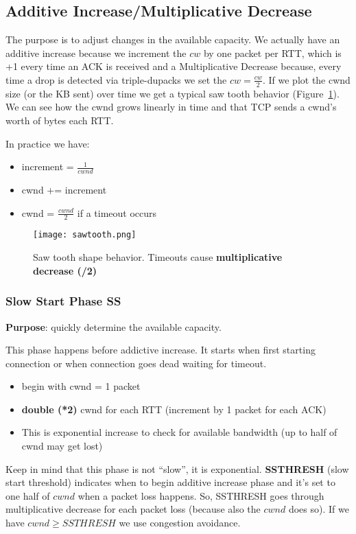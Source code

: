 \subsection{Additive Increase/Multiplicative Decrease}

The purpose is to adjust changes in the available capacity.
We actually have an additive increase because we increment the $cw$ by one
packet per RTT, which is +1 every time an ACK is received and a Multiplicative
Decrease because, every time a drop is detected via triple-dupacks we set the
$cw=\frac{cw}{2}$. If we plot the cwnd size (or the KB sent) over time we get a
typical saw tooth behavior (Figure~\ref{fig:tcp:sawtooth}). We can see how the
cwnd grows linearly in time and that TCP sends a cwnd's worth of bytes each RTT.

In practice we have:
\begin{itemize}
  \item increment = $\frac{1}{cwnd}$
  \item cwnd += increment
  \item cwnd = $\frac{cwnd}{2}$ if a timeout occurs
\end{itemize}

\begin{figure}[t]
\texttt{[image: sawtooth.png]}
\caption[Saw tooth shape behavior]{Saw tooth shape behavior. Timeouts cause
  \textbf{multiplicative decrease (/2)}}
\label{fig:tcp:sawtooth}
\end{figure}

\subsubsection{Slow Start Phase SS}

\textbf{Purpose}: quickly determine the available capacity.

\noindent This phase happens before addictive increase. It starts when first
starting connection or when connection goes dead waiting for timeout.

\begin{itemize}
\item begin with cwnd = 1 packet
\item \textbf{double (*2)} cwnd for each RTT (increment by 1 packet for each
  ACK)
\item This is exponential increase to check for available bandwidth (up to half
  of cwnd may get lost)
\end{itemize}

Keep in mind that this phase is not ``slow'', it is exponential.
\textbf{SSTHRESH} (slow start threshold) indicates when to begin additive
increase phase and it's set to one half of $cwnd$ when a packet loss happens.
So, SSTHRESH goes through multiplicative decrease for each packet loss (because
also the $cwnd$ does so).
If we have $cwnd \ge SSTHRESH$ we use congestion avoidance.


